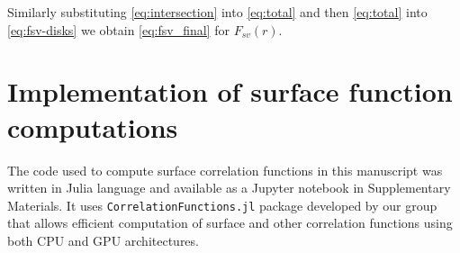 \documentclass[reprint,amsmath,amssymb,aps,pre,showkeys,showpacs]{revtex4-1}
\newcommand{\code}[1]{\colorbox{light-gray}{\texttt{#1}}}
\begin{document}
Similarly substituting \cref{eq:intersection} into \cref{eq:total} and then
\cref{eq:total} into \cref{eq:fsv-disks} we obtain \cref{eq:fsv_final} for
$F_{sv}(r)$.

\section{Implementation of surface function computations}
The code used to compute surface correlation functions in this manuscript was
written in Julia language and available as a Jupyter notebook in Supplementary
Materials. It uses \code{CorrelationFunctions.jl} package developed by our group
\cite{CFsjlpaper} that allows efficient computation of surface and other
correlation functions using both CPU and GPU architectures.


\end{document}
